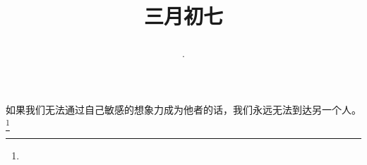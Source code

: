\title{\date[d=15,m=4,y=2024][year:cn-y,年,month:cn,day:cn,日,·,weekday]·三月初七 }
如果我们无法通过自己敏感的想象力成为他者的话，我们永远无法到达另一个人。\footnote{ }

